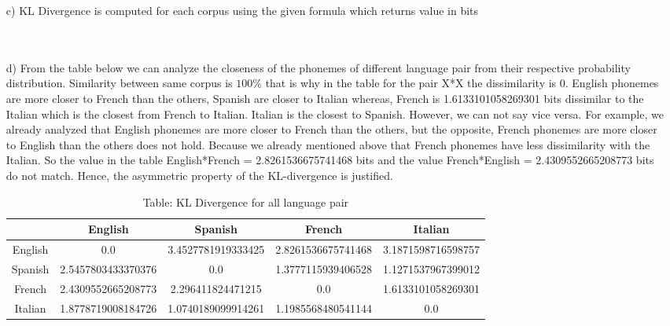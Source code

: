 \documentclass{article}
\begin{document}
\begin{itemize}
    \item[c)]
    KL Divergence is computed for each corpus using the given formula which returns value in bits 
    \\\\\\
    \item[d)]  
        From the table below we can analyze the closeness of the phonemes of different language pair from their respective probability distribution. Similarity between same corpus is $100\%$ that is why in the table for the pair X*X the dissimilarity is 0. English phonemes are more closer to French than the others, Spanish are closer to Italian whereas, French is 1.6133101058269301 bits dissimilar to the Italian which is the closest from French to Italian. Italian is the closest to Spanish. However, we can not say vice versa. For example, we already analyzed that English phonemes are more closer to French than the others, but the opposite, French phonemes are more closer to English than the others does not hold. Because we already mentioned above that French phonemes have less dissimilarity with the Italian. So the value in the table English*French = 2.8261536675741468 bits and the value French*English = 2.4309552665208773 bits do not match. Hence, the asymmetric property of the KL-divergence is justified.
        \begin{table}[ht]
            \centering
            \begin{tabular}{|c| c| c| c| c|}
                \hline 
                & English & Spanish & French & Italian \\ [0.5ex]
                \hline
                English & 0.0 & 3.4527781919333425 & 2.8261536675741468 & 3.1871598716598757\\
                \hline
                Spanish & 2.5457803433370376 & 0.0 & 1.3777115939406528 & 1.1271537967399012 \\
                \hline
                French & 2.4309552665208773 & 2.296411824471215 & 0.0 & 1.6133101058269301 \\
                \hline
                Italian & 1.8778719008184726 & 1.0740189099914261 & 1.1985568480541144 & 0.0   \\ [1ex]
                \hline
            \end{tabular}
            \caption{\hspace*{4.0cm}Table: KL Divergence for all language pair}
        \end{table}
        \end{itemize}
\end{document}

